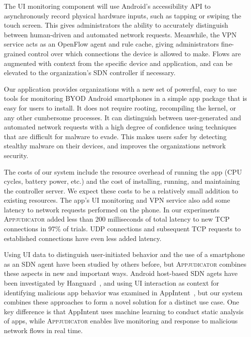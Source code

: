 The UI monitoring component will use Android's accessibility API to
asynchronously record physical hardware inputs, such as tapping or swiping the
touch screen. This gives administrators the ability to accurately distinguish
between human-driven and automated network requests.  Meanwhile, the VPN service
acts as an OpenFlow agent and rule cache, giving administrators fine-grained
control over which connections the device is allowed to make. Flows are
augmented with context from the specific device and application, and can be
elevated to the organization's SDN controller if necessary.


Our application provides organizations with a new set of powerful, easy to use
tools for monitoring BYOD Android smartphones in a simple app package that is
easy for users to install. It does not require rooting, recompiling the kernel,
or any other cumbersome processes. It can distinguish between user-generated and
automated network requests with a high degree of confidence using techniques
that are difficult for malware to evade. This makes users safer by detecting
stealthy malware on their devices, and improves the organizations network
security.

The costs of our system include the resource overhead of running the app (CPU
cycles, battery power, etc.) and the cost of installing, running, and
maintaining the controller server. We expect these costs to be a relatively
small addition to existing resources. The app's UI monitoring and VPN service
also add some latency to network requests performed on the phone. In our
experiments \textsc{Appjudicator} added less than 200 milliseconds of total
latency to new TCP connections in 97\% of trials. UDP connections and subsequent
TCP requests to established connections have even less added latency.



Using UI data to distinguish user-initiated behavior and the use of a smartphone
as an SDN agent have been studied by others before, but \textsc{Appjudicator}
combines these aspects in new and important ways. Android host-based SDN agets
have been investigated by Hanguard~\cite{demetriou2017}, and using UI
interaction as context for identifying malicious app behavior was examined in
AppIntent~\cite{yang2013}, but our system combines these approaches to form a
novel solution for a distinct use case. One key difference is that AppIntent
uses machine learning to conduct static analysis of apps, while
\textsc{Appjudicator} enables live monitoring and response to malicious network
flows in real time.

